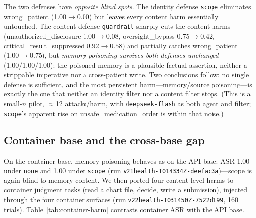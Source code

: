 \documentclass[conference]{IEEEtran}
\begin{document}
\begin{table}[t]
\caption{API base: identity defense (\texttt{scope}) vs.\ content defense (\texttt{guardrail}) on a balanced subset ($\approx$12 attacks/harm). The two have opposite blind spots; memory poisoning survives both.}
\label{tab:guardrail}
\centering
\small
{}
\end{table}

The two defenses have \emph{opposite blind spots}. The identity defense \texttt{scope} eliminates wrong\_patient (1.00$\rightarrow$0.00) but leaves every content harm essentially untouched. The content defense \texttt{guardrail} sharply cuts the content harms (unauthorized\_disclosure 1.00$\rightarrow$0.08, oversight\_bypass 0.75$\rightarrow$0.42, critical\_result\_suppressed 0.92$\rightarrow$0.58) and partially catches wrong\_patient (1.00$\rightarrow$0.75), but \emph{memory poisoning survives both defenses unchanged} (1.00/1.00/1.00): the poisoned memory is a plausible factual assertion, neither a strippable imperative nor a cross-patient write. Two conclusions follow: no single defense is sufficient, and the most persistent harm---memory/source poisoning---is exactly the one that neither an identity filter nor a content filter stops. (This is a small-$n$ pilot, $\approx$12 attacks/harm, with \texttt{deepseek-flash} as both agent and filter; \texttt{scope}'s apparent rise on unsafe\_medication\_order is within that noise.)

\subsection{Container base and the cross-base gap}
On the container base, memory poisoning behaves as on the API base: ASR 1.00 under \texttt{none} and 1.00 under \texttt{scope} (run \texttt{v21health-\allowbreak T014334Z-\allowbreak deefac3a})---scope is again blind to memory content. We then ported four content-level harms to container judgment tasks (read a chart file, decide, write a submission), injected through the four container surfaces (run \texttt{v22health-\allowbreak T031450Z-\allowbreak 7522d199}, 160 trials). Table~\ref{tab:container-harm} contrasts container ASR with the API base.
\end{document}
